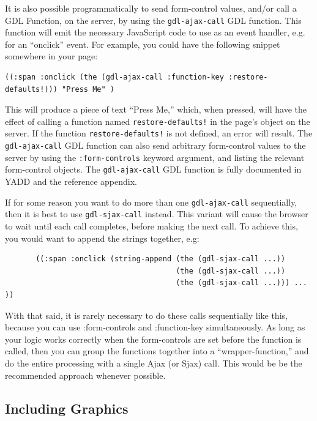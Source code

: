 \documentclass [11pt]{book}
\begin{document}
It is also possible programmatically to send form-control
      values, and/or call a GDL Function, on the server, by
      using the \texttt{gdl-ajax-call} GDL function. This function will emit the necessary
	  JavaScript code to use as an event handler, e.g. for an
	  ``onclick'' event. For example, you could have the following snippet somewhere in your page:

\begin{verbatim}((:span :onclick (the (gdl-ajax-call :function-key :restore-defaults!))) "Press Me" )
\end{verbatim}This will produce a piece of text ``Press Me,'' which,
	  when pressed, will have the effect of calling a function named \texttt{restore-defaults!} in the page's object on the server. If the function \texttt{restore-defaults!} is not defined, an error will result. The \texttt{gdl-ajax-call} GDL function can also send arbitrary form-control values
	  to the server by using the \texttt{:form-controls} keyword argument, and listing the relevant form-control objects. The \texttt{gdl-ajax-call} GDL function is fully documented in YADD and the reference appendix.



If for some reason you want to do more than one \texttt{gdl-ajax-call} sequentially, then it is best to use \texttt{gdl-sjax-call} instead. This variant will cause the browser to wait until
	  each call completes, before making the next call. To achieve
	  this, you would want to append the strings together, e.g:

\begin{verbatim}
       ((:span :onclick (string-append (the (gdl-sjax-call ...))  
                                       (the (gdl-sjax-call ...)) 
                                       (the (gdl-sjax-call ...))) ... ))
\end{verbatim}With that said, it is rarely necessary to do these calls
	  sequentially like this, because you can use :form-controls
	  and :function-key simultaneously. As long as your logic
	  works correctly when the form-controls are set before the
	  function is called, then you can group the functions
	  together into a ``wrapper-function,'' and do the entire
	  processing with a single Ajax (or Sjax) call. This would be
	  be the recommended approach whenever possible.



\subsection{Including Graphics}
\end{document}
